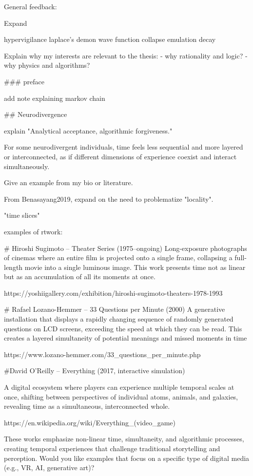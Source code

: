 

General feedback: 

Expand 

hypervigilance
laplace's demon
wave function collapse
emulation
decay

Explain why my interests are relevant to the thesis:  
 - why rationality and logic?
 - why physics and algorithms? 


### preface 

add note explaining markov chain 



## Neurodivergence

explain  "Analytical acceptance, algorithmic forgiveness." 


For some neurodivergent individuals, time feels less
sequential and more layered or interconnected, as if different
dimensions of experience coexist and interact simultaneously.

Give an example from my bio or literature. 

From Benasayang2019, expand on the need to problematize "locality". 


"time slices"

examples of rtwork: 

# Hiroshi Sugimoto – Theater Series (1975–ongoing)
Long-exposure photographs of cinemas where an entire film is projected onto a single frame, collapsing a full-length movie into a single luminous image. This work presents time not as linear but as an accumulation of all its moments at once.

https://yoshiigallery.com/exhibition/hiroshi-sugimoto-theaters-1978-1993


# Rafael Lozano-Hemmer – 33 Questions per Minute (2000)
A generative installation that displays a rapidly changing sequence of randomly generated questions on LCD screens, exceeding the speed at which they can be read. This creates a layered simultaneity of potential meanings and missed moments in time

https://www.lozano-hemmer.com/33_questions_per_minute.php



#David O’Reilly – Everything (2017, interactive simulation)

A digital ecosystem where players can experience multiple temporal scales at once, shifting between perspectives of individual atoms, animals, and galaxies, revealing time as a simultaneous, interconnected whole.

https://en.wikipedia.org/wiki/Everything_(video_game)

These works emphasize non-linear time, simultaneity, and algorithmic processes, creating temporal experiences that challenge traditional storytelling and perception. Would you like examples that focus on a specific type of digital media (e.g., VR, AI, generative art)?


